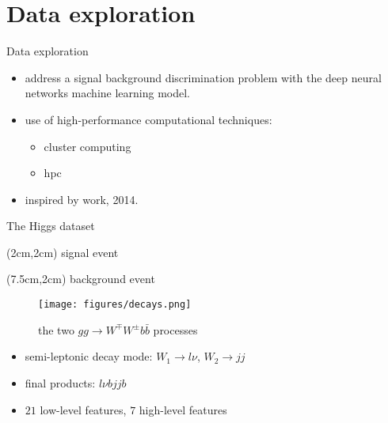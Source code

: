 \documentclass{beamer}
\begin{document}
\section{Data exploration}
\begin{frame}{Data exploration}
 \begin{itemize}
  \item address a signal background discrimination problem with the deep
        neural networks machine learning model.
  \item use of high-performance computational techniques:
        \begin{itemize}
         \item cluster computing
         \item hpc
        \end{itemize}
  \item inspired by \cite{paper} work, 2014.
 \end{itemize}
\end{frame}
\begin{frame}{The Higgs dataset}
 \begin{textblock*}{8cm}(2cm,2cm) %
  signal event
 \end{textblock*}
 \begin{textblock*}{8cm}(7.5cm,2cm) %
  background event
 \end{textblock*}
 \begin{figure}[htpb]
  \centering
  \texttt{[image: figures/decays.png]}
  \caption{the two $gg \rightarrow W^\mp W^\pm b \bar{b}$ processes}
  \label{graphs}
 \end{figure}
 
 \begin{itemize}
  \item semi-leptonic decay mode: $W_1 \rightarrow l\nu$, $W_2 \rightarrow jj $
  \item final products: $l\nu bjjb$
  \item $21$ low-level features, $7$ high-level features
 \end{itemize}
 
\end{frame}
\end{document}
